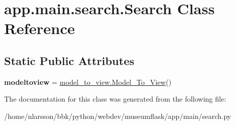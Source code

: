 \hypertarget{classapp_1_1main_1_1search_1_1Search}{}\section{app.\+main.\+search.\+Search Class Reference}
\label{classapp_1_1main_1_1search_1_1Search}
\subsection*{Static Public Attributes}
\begin{DoxyCompactItemize}
\item 
\mbox{\label{classapp_1_1main_1_1search_1_1Search_ac3c27e720804c176c2c14c3e02c02119}} 
{\bfseries modeltoview} = \mbox{\hyperlink{classapp_1_1main_1_1model__to__view_1_1Model__To__View}{model\+\_\+to\+\_\+view.\+Model\+\_\+\+To\+\_\+\+View}}()
\end{DoxyCompactItemize}


The documentation for this class was generated from the following file\+:\begin{DoxyCompactItemize}
\item 
/home/nlarsson/bbk/python/webdev/museumflask/app/main/search.\+py\end{DoxyCompactItemize}
